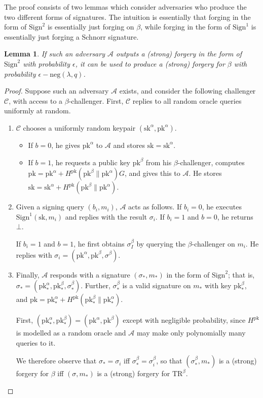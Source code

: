 \documentclass[letterpaper]{article}
\newtheorem{lmma}{Lemma}
\newcommand{\TR}[1]{\mathrm{TR}^{#1}}
\newcommand{\Sign}{\mathrm{Sign}}
\newcommand{\sk}{\mathrm{sk}}
\newcommand{\pk}{\mathrm{pk}}
\newcommand{\negl}{\mathrm{neg}}
\begin{document}
The proof consists of two lemmas which consider adversaries who produce the
two different forms of signatures. The intuition is essentially that forging
in the form of $\Sign^2$ is essentially just forging on $\beta$, while
forging in the form of $\Sign^1$ is essentially just forging a Schnorr signature.

\begin{lmma} If such an adversary $\mathcal{A}$ outputs a (strong) forgery in
the form of $\Sign^2$ with probability $\epsilon$, it can be used to produce a
(strong) forgery for $\beta$ with probability $\epsilon-\negl(\lambda,q)$.
\end{lmma}

\begin{proof} Suppose such an adversary $\mathcal{A}$ exists, and consider the
following challenger $\mathcal{C}$, with access to a $\beta$-challenger. First, $\mathcal{C}$ replies to all random
oracle queries uniformly at random.
\begin{enumerate}
\item $\mathcal{C}$ chooses a uniformly random keypair $(\sk^\alpha, \pk^\alpha)$.
\begin{itemize}
\item If $b=0$, he gives $\pk^\alpha$ to $\mathcal{A}$ and stores $\sk=\sk^\alpha$.
\item If $b=1$, he requests a public key $\pk^\beta$ from his $\beta$-challenger,
computes $\pk=\pk^\alpha+ H^\pk(\pk^\beta\|\pk^\alpha)G$, and gives this to $\mathcal{A}$.
He stores $\sk=\sk^\alpha+H^\pk(\pk^\beta\|\pk^\alpha)$.
\end{itemize}

\item Given a signing query $(b_i,m_i)$, $\mathcal{A}$ acts as follows. If $b_i=0$,
he executes $\Sign^1(\sk,m_i)$ and replies with the result $\sigma_i$. If $b_i=1$ and
$b=0$, he returns $\bot$.

If $b_i=1$ and $b=1$, he first obtains $\sigma^\beta_I$ by querying the
$\beta$-challenger on $m_i$. He replies with $\sigma_i=(\pk^\alpha,\pk^\beta,\sigma^\beta)$.

\item Finally, $\mathcal{A}$ responds with a signature $(\sigma_*, m_*)$ in the
form of $\Sign^2$; that is, $\sigma_* = (\pk^\alpha_*, \pk^\beta_*, \sigma^\beta_*)$.
Further, $\sigma^\beta_*$ is a valid signature on $m_*$
with key $\pk^\beta_*$, and $\pk = \pk^\alpha_* + H^\pk(\pk^\beta_*\|\pk^\alpha_*)$.

First, $(\pk^\alpha_*, \pk^\beta_*) = (\pk^\alpha, \pk^\beta)$ except with negligible
probability, since $H^\pk$ is modelled as a random oracle and $\mathcal{A}$ may make
only polynomially many queries to it.

We therefore observe that $\sigma_* = \sigma_i$ iff $\sigma^\beta_* = \sigma^\beta_i$, so that
$(\sigma^\beta_*, m_*)$ is a (strong) forgery for $\beta$ iff $(\sigma, m_*)$ is a
(strong) forgery for $\TR\beta$.
\end{enumerate}
\end{proof}
\end{document}
